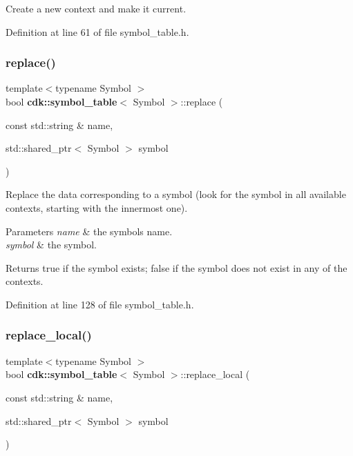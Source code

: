 Create a new context and make it current. 

Definition at line 61 of file symbol\+\_\+table.\+h.

\mbox{\label{classcdk_1_1symbol__table_a887f0b22fc52c38db603edc2204c578e}} 
\subsubsection{replace()}
{\footnotesize\ttfamily template$<$typename Symbol $>$ \\
bool \textbf{ cdk\+::symbol\+\_\+table}$<$ Symbol $>$\+::replace (\begin{DoxyParamCaption}\item[{const std\+::string \&}]{name,  }\item[{std\+::shared\+\_\+ptr$<$ Symbol $>$}]{symbol }\end{DoxyParamCaption})\hspace{0.3cm}{\ttfamily [inline]}}

Replace the data corresponding to a symbol (look for the symbol in all available contexts, starting with the innermost one).


\begin{DoxyParams}{Parameters}
{\em name} & the symbol\textquotesingle{}s name. \\
\hline
{\em symbol} & the symbol. \\
\hline
\end{DoxyParams}
\begin{DoxyReturn}{Returns}
{\ttfamily true} if the symbol exists; {\ttfamily false} if the symbol does not exist in any of the contexts. 
\end{DoxyReturn}


Definition at line 128 of file symbol\+\_\+table.\+h.

\mbox{\label{classcdk_1_1symbol__table_af15e8e2e900c8661a94f72a71978f16e}} 
\subsubsection{replace\+\_\+local()}
{\footnotesize\ttfamily template$<$typename Symbol $>$ \\
bool \textbf{ cdk\+::symbol\+\_\+table}$<$ Symbol $>$\+::replace\+\_\+local (\begin{DoxyParamCaption}\item[{const std\+::string \&}]{name,  }\item[{std\+::shared\+\_\+ptr$<$ Symbol $>$}]{symbol }\end{DoxyParamCaption})\hspace{0.3cm}{\ttfamily [inline]}}

